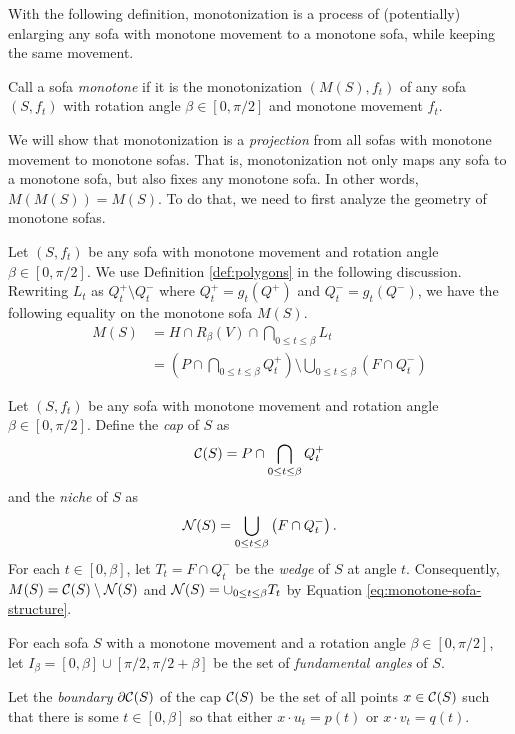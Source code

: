 With the following definition, monotonization is a process of (potentially) enlarging any sofa with monotone movement to a monotone sofa, while keeping the same movement.
\begin{definition}
Call a sofa \emph{monotone} if it is the monotonization $(M(S), f_t)$ of any sofa $(S, f_t)$ with rotation angle $\beta \in [0, \pi / 2]$ and monotone movement $f_t$.
\end{definition}
We will show that monotonization is a \emph{projection} from all sofas with monotone movement to monotone sofas.
That is, monotonization not only maps any sofa to a monotone sofa, but also fixes any monotone sofa.
In other words, $M(M(S)) = M(S)$.
To do that, we need to first analyze the geometry of monotone sofas.

Let $(S, f_t)$ be any sofa with monotone movement and rotation angle $\beta \in [0, \pi / 2]$.
We use Definition \ref{def:polygons} in the following discussion.
Rewriting $L_t$ as $Q^+_t \setminus Q^-_t$ where $Q^+_t = g_t(Q^+)$ and $Q^-_t = g_t(Q^-)$, we have the following equality on the monotone sofa $M(S)$. 
\begin{align}
M(S) & = H \cap R_\beta(V) \cap \bigcap_{0 \leq t \leq \beta} L_t \\
\label{eq:monotone-sofa-structure}
& = \left(P \cap \bigcap_{0 \leq t \leq \beta} Q^+_t \right) \setminus \bigcup_{0 \leq t \leq \beta} \left(F \cap Q^-_t \right) 
\end{align}
\begin{definition}
\label{def:cap-niche}
Let $(S, f_t)$ be any sofa with monotone movement and rotation angle $\beta \in [0, \pi / 2]$. Define the \emph{cap} of $S$ as
$$\mathcal{C}(S) = P \cap \bigcap_{0 \leq t \leq \beta} Q^+_t$$
and the \emph{niche} of $S$ as
$$\mathcal{N}(S) = \bigcup_{0 \leq t \leq \beta} \left(F \cap Q^-_t \right).$$
For each $t \in [0, \beta]$, let $T_t = F \cap Q^-_t$ be the \emph{wedge} of $S$ at angle $t$.
Consequently, $M(S) = \mathcal{C}(S) \setminus \mathcal{N}(S)$ and $\mathcal{N}(S) = \cup_{0 \leq t \leq \beta} T_t$ by Equation \ref{eq:monotone-sofa-structure}.
\end{definition}

\begin{definition}
\label{def:boundary}
For each sofa $S$ with a monotone movement and a rotation angle $\beta \in [0, \pi / 2]$, let $I_\beta = [0, \beta] \cup [\pi / 2, \pi / 2 + \beta]$ be the set of \emph{fundamental angles} of $S$.

Let the \emph{boundary} $\partial \mathcal{C}(S)$ of the cap $\mathcal{C}(S)$ be the set of all points $x \in \mathcal{C}(S)$ such that there is some $t \in [0, \beta]$ so that either $x \cdot u_t = p(t)$ or $x \cdot v_t = q(t)$.
\end{definition}

